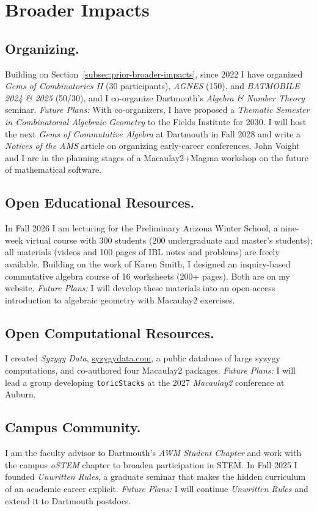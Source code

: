 \documentclass[11pt,reqno]{amsart}
\theoremstyle{remark}
\begin{document}
\section{Broader Impacts}\label{sec:broader-impacts}
\subsection{Organizing.} Building on Section~\ref{subsec:prior-broader-impacts}, since 2022 I have organized \textit{Gems of Combinatorics II} (30 participants), \textit{AGNES} (150), and \textit{BATMOBILE 2024 \& 2025} (50/30), and I co-organize Dartmouth's \textit{Algebra \& Number Theory} seminar. \emph{Future Plans:}  With co-organizers, I have proposed a \textit{Thematic Semester in Combinatorial Algebraic Geometry} to the Fields Institute for 2030. I will host the next \textit{Gems of Commutative Algebra} at Dartmouth in Fall 2028 and write a \textit{Notices of the AMS} article on organizing early-career conferences. John Voight and I are in the planning stages of a Macaulay2+Magma workshop on the future of mathematical software.

\subsection{Open Educational Resources.} In Fall 2026 I am lecturing for the Preliminary Arizona Winter School, a nine-week virtual course with 300 students (200 undergraduate and master's students); all materials (videos and 100 pages of IBL notes and problems) are freely available. Building on the work of Karen Smith, I designed an inquiry-based commutative algebra course of 16 worksheets (200+ pages). Both are on my website.  \emph{Future Plans:} I will develop these materials into an open-access introduction to algebraic geometry with Macaulay2 exercises.
 
\subsection{Open Computational Resources.} I created \textit{Syzygy Data}, \url{syzygydata.com}, a public database of large syzygy computations, and co-authored four Macaulay2 packages. \emph{Future Plans:} I will lead a group developing \texttt{toricStacks} at the 2027 \textit{Macaulay2} conference at Auburn.

\subsection{Campus Community.} I am the faculty advisor to Dartmouth's \textit{AWM Student Chapter} and work with the campus \textit{oSTEM} chapter to broaden participation in STEM. In Fall 2025 I founded \textit{Unwritten Rules}, a graduate seminar that makes the hidden curriculum of an academic career explicit. \emph{Future Plans:} I will continue \textit{Unwritten Rules} and extend it to Dartmouth postdocs.
\end{document}
